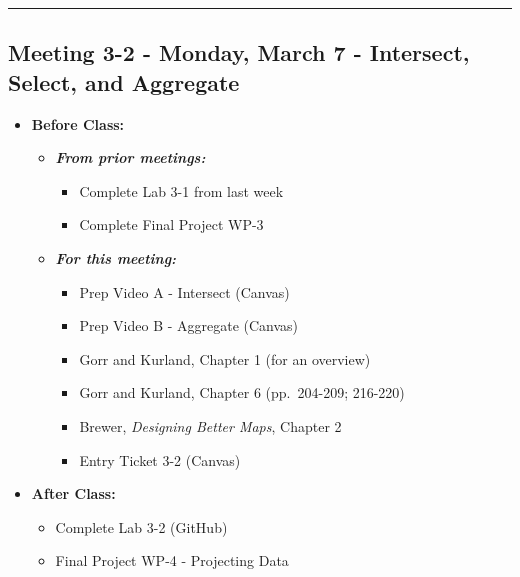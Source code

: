 \documentclass[
]{book}
\providecommand{\tightlist}{%
  \setlength{\itemsep}{0pt}\setlength{\parskip}{0pt}}
\begin{document}
\begin{center}\rule{0.5\linewidth}{0.5pt}\end{center}

\hypertarget{meeting-3-2---monday-march-7---intersect-select-and-aggregate}{%
\subsection*{Meeting 3-2 - Monday, March 7 - Intersect, Select, and Aggregate}\label{meeting-3-2---monday-march-7---intersect-select-and-aggregate}}

\begin{itemize}
\tightlist
\item
  \textbf{Before Class:}

  \begin{itemize}
  \tightlist
  \item
    \textbf{\emph{From prior meetings:}}

    \begin{itemize}
    \tightlist
    \item
      Complete Lab 3-1 from last week
    \item
      Complete Final Project WP-3
    \end{itemize}
  \item
    \textbf{\emph{For this meeting:}}

    \begin{itemize}
    \tightlist
    \item
      Prep Video A - Intersect (Canvas)
    \item
      Prep Video B - Aggregate (Canvas)
    \item
      Gorr and Kurland, Chapter 1 (for an overview)
    \item
      Gorr and Kurland, Chapter 6 (pp.~204-209; 216-220)
    \item
      Brewer, \emph{Designing Better Maps}, Chapter 2
    \item
      Entry Ticket 3-2 (Canvas)
    \end{itemize}
  \end{itemize}
\item
  \textbf{After Class:}

  \begin{itemize}
  \tightlist
  \item
    Complete Lab 3-2 (GitHub)
  \item
    Final Project WP-4 - Projecting Data
  \end{itemize}
\end{itemize}
\end{document}
